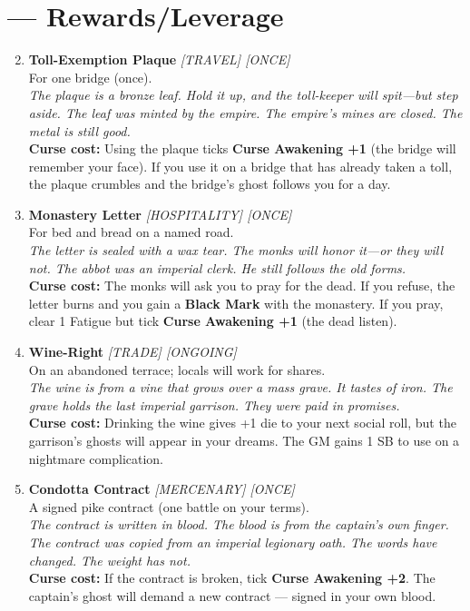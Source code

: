 \section*{ --- Rewards/Leverage}
\label{sec:acasia-rewards}
\begin{enumerate}
\setcounter{enumi}{1}
\item \textbf{Toll-Exemption Plaque} \hfill {} \textit{[TRAVEL] [ONCE]} \\
  For one bridge (once). \\
  \textit{The plaque is a bronze leaf. Hold it up, and the toll-keeper will spit---but step aside. The leaf was minted by the empire. The empire's mines are closed. The metal is still good.} \\
  \textbf{Curse cost:} Using the plaque ticks \textbf{Curse Awakening +1} (the bridge will remember your face). If you use it on a bridge that has already taken a toll, the plaque crumbles and the bridge's ghost follows you for a day.

\item \textbf{Monastery Letter} \hfill {} \textit{[HOSPITALITY] [ONCE]} \\
  For bed and bread on a named road. \\
  \textit{The letter is sealed with a wax tear. The monks will honor it---or they will not. The abbot was an imperial clerk. He still follows the old forms.} \\
  \textbf{Curse cost:} The monks will ask you to pray for the dead. If you refuse, the letter burns and you gain a \textbf{Black Mark} with the monastery. If you pray, clear 1 Fatigue but tick \textbf{Curse Awakening +1} (the dead listen).

\item \textbf{Wine-Right} \hfill {} \textit{[TRADE] [ONGOING]} \\
  On an abandoned terrace; locals will work for shares. \\
  \textit{The wine is from a vine that grows over a mass grave. It tastes of iron. The grave holds the last imperial garrison. They were paid in promises.} \\
  \textbf{Curse cost:} Drinking the wine gives +1 die to your next social roll, but the garrison's ghosts will appear in your dreams. The GM gains 1 SB to use on a nightmare complication.

\item \textbf{Condotta Contract} \hfill {} \textit{[MERCENARY] [ONCE]} \\
  A signed pike contract (one battle on your terms). \\
  \textit{The contract is written in blood. The blood is from the captain's own finger. The contract was copied from an imperial legionary oath. The words have changed. The weight has not.} \\
  \textbf{Curse cost:} If the contract is broken, tick \textbf{Curse Awakening +2}. The captain's ghost will demand a new contract --- signed in your own blood.


\end{enumerate}
